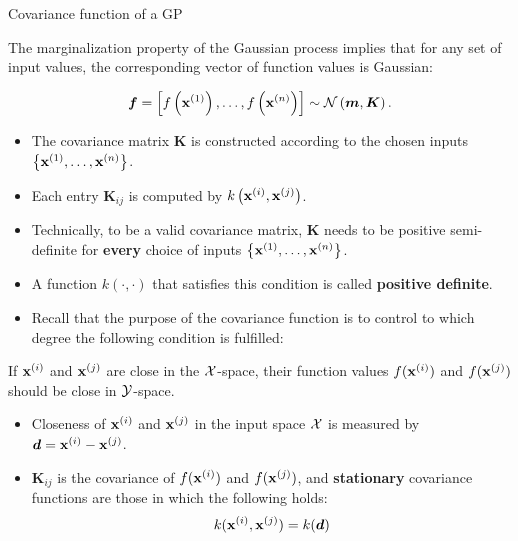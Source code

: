 \begin{frame}[c,allowframebreaks]{Covariance function of a GP}

The marginalization property of the Gaussian process implies that for any set of input values, the corresponding vector of function values is Gaussian:

  $$
    \bm{f} = \left[f\left(\mathbf{x}^{(1)}\right),\dots, f\left(\mathbf{x}^{(n)}\right)\right] \sim \mathcal{N}\left(\bm{m}, \bm{K}\right).
  $$ 


\begin{itemize}

  \item The covariance matrix $\bm{K}$ is constructed according to the chosen inputs $\left\{\mathbf{x}^{(1)},\dots,\mathbf{x}^{(n)}\right\}$.
  \item Each entry $\bm{K}_{ij}$ is computed by $k\left(\mathbf{x}^{(i)}, \mathbf{x}^{(j)}\right)$.
  \item Technically, to be a valid covariance matrix, $\bm{K}$ needs to be positive semi-definite for \textbf{every} choice of inputs $\left\{\mathbf{x}^{(1)},\dots,\mathbf{x}^{(n)}\right\}$.
  \item A function $k(\cdot,\cdot)$ that satisfies this condition is called \textbf{positive definite}.
  
\end{itemize}
\framebreak

\begin{itemize}
\item Recall that the purpose of the covariance function is to control to which degree the following condition is fulfilled:
\end{itemize}
\lz
\begin{displayquote}
If $\mathbf{x}^{(i)}$ and $\mathbf{x}^{(j)}$ are close in the $\mathcal{X}$-space, their function values $f(\mathbf{x}^{(i)})$ and $f(\mathbf{x}^{(j)})$ should be close in $\mathcal{Y}$-space.
\end{displayquote}

\lz
\lz

\begin{itemize}
\item[\faLightbulbO] Closeness of $\mathbf{x}^{(i)}$ and $\mathbf{x}^{(j)}$ in the input space $\mathcal{X}$ is measured by $\bm{d} =\mathbf{x}^{(i)}-\mathbf{x}^{(j)}$. 

\lz

\item[\faLightbulbO] $\bm{K}_{ij}$ is the covariance of $f(\mathbf{x}^{(i)})$ and $f(\mathbf{x}^{(j)})$, and \textbf{stationary} covariance functions are those in which the following holds:$$k(\mathbf{x}^{(i)}, \mathbf{x}^{(j)}) = k(\bm{d})$$ 
\end{itemize}

\end{frame}

